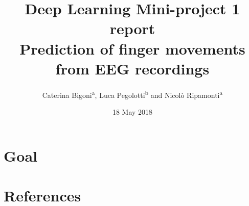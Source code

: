 \documentclass{article}
\begin{document}
\title{Deep Learning Mini-project 1 report \\ Prediction of finger movements from EEG recordings}
\author{Caterina Bigoni\textsuperscript{a}, Luca Pegolotti\textsuperscript{b} and Nicol\`o Ripamonti\textsuperscript{a}}
\date{18 May 2018}
\maketitle



\section{Goal}
 
 
 \renewcommand\refname{\vskip -1cm}
%
%
%
\section{References}
 
  
\end{document}
